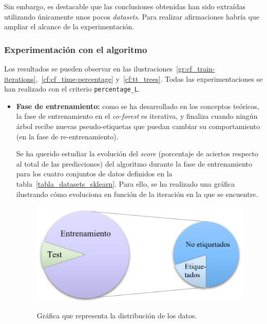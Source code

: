 Sin embargo, es destacable que las conclusiones obtenidas han sido extraídas utilizando únicamente unos pocos \textit{datasets}. Para realizar afirmaciones habría que ampliar el alcance de la experimentación.



\subsubsection{Experimentación con el algoritmo}

Los resultados se pueden observar en las ilustraciones~\ref{gr:cf_train-iterations},~\ref{cf:cf_time-percentage} y~\ref{cf:tt_trees}. Todas las experimentaciones se han realizado con el criterio \texttt{percentage\_L}.


\begin{itemize}
	\item \textbf{Fase de entrenamiento:} como se ha desarrollado en los conceptos teóricos, la fase de entrenamiento en el \textit{co-forest} es iterativa, y finaliza cuando ningún árbol recibe nuevas pseudo-etiquetas que puedan cambiar su comportamiento (en la fase de re-entrenamiento).
	
	Se ha querido estudiar la evolución del \textit{score} (porcentaje de aciertos respecto al total de las predicciones) del algoritmo durante la fase de entrenamiento para los cuatro conjuntos de datos definidos en la tabla~\ref{tabla_datasets_sklearn}. Para ello, se ha realizado una gráfica ilustrando cómo evoluciona en función de la iteración en la que se encuentre.
	
	\begin{figure}[h]
		\caption[\textit{Co-Forest}: distribución de datos entrenamiento y \textit{test}]{Gráfica que representa la distribución de los datos.}
		\centering
		\includegraphics[scale=0.3]{../img/memoria/5_entrenamiento_particiones}
		\label{5_entrenamiento_particiones}
	\end{figure}


\end{itemize}

